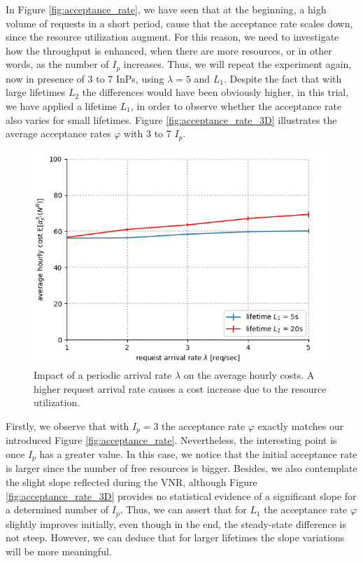 In Figure \ref{fig:acceptance_rate}, we have seen that at the beginning, a high volume of requests in a short period, cause that the acceptance rate scales down, since the resource utilization augment. For this reason, we need to investigate how the throughput is enhanced, when there are more resources, or in other words, as the number of $I_p$ increases. Thus, we will repeat the experiment again, now in presence of 3 to 7 InPs, using $\lambda = 5$ and $L_1$. Despite the fact that with large lifetimes $L_2$ the differences would have been obviously higher, in this trial, we have applied a lifetime $L_1$, in order to observe whether the acceptance rate also varies for small lifetimes. Figure \ref{fig:acceptance_rate_3D} illustrates the average acceptance rates $\varphi$ with 3 to 7 $I_p$.

\begin{figure}[bth]
	\centering
	\includegraphics[scale=0.68]{gfx/ev_pricing.png}    
  	\caption{Impact of a periodic arrival rate $\lambda$ on the average hourly costs. A higher request arrival rate causes a cost increase due to the resource utilization.} 
  	\label{fig:pricing}
\end{figure}

Firstly, we observe that with $I_p = 3$ the acceptance rate $\varphi$ exactly matches our introduced Figure \ref{fig:acceptance_rate}. Nevertheless, the interesting point is once $I_p$ has a greater value. In this case, we notice that the initial acceptance rate is larger since the number of free resources is bigger. Besides, we also contemplate the slight slope reflected during the VNR, although Figure \ref{fig:acceptance_rate_3D} provides no statistical evidence of a significant slope for a determined number of $I_p$. Thus, we can assert that for $L_1$ the acceptance rate $\varphi$ slightly improves initially, even though in the end, the steady-state difference is not steep. However, we can deduce that for larger lifetimes the slope variations will be more meaningful.

